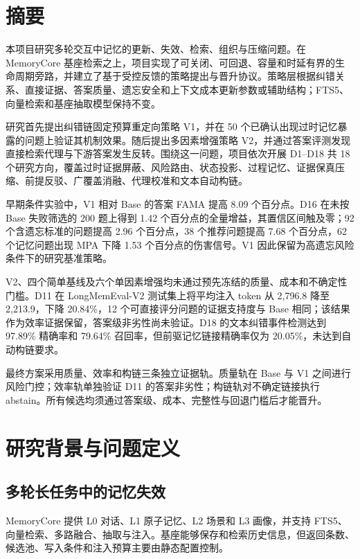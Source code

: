 \section*{摘要}

本项目研究多轮交互中记忆的更新、失效、检索、组织与压缩问题。在 MemoryCore 基座检索之上，项目实现了可关闭、可回退、容量和时延有界的生命周期旁路，并建立了基于受控反馈的策略提出与晋升协议。策略层根据纠错关系、直接证据、答案质量、遗忘安全和上下文成本更新参数或辅助结构；FTS5、向量检索和基座抽取模型保持不变。

研究首先提出纠错链固定预算重定向策略 V1，并在 50 个已确认出现过时记忆暴露的问题上验证其机制效果。随后提出多因素增强策略 V2，并通过答案评测发现直接检索代理与下游答案发生反转。围绕这一问题，项目依次开展 D1--D18 共 18 个研究方向，覆盖过时证据屏蔽、风险路由、状态投影、过程记忆、证据保真压缩、前提反驳、广覆盖消融、代理校准和文本自动构链。

早期条件实验中，V1 相对 Base 的答案 FAMA 提高 8.09 个百分点。D16 在未按 Base 失败筛选的 200 题上得到 1.42 个百分点的全量增益，其置信区间触及零；92 个含遗忘标准的问题提高 2.96 个百分点，38 个推荐问题提高 7.68 个百分点，62 个记忆问题出现 MPA 下降 1.53 个百分点的伤害信号。V1 因此保留为高遗忘风险条件下的研究基准策略。

V2、四个简单基线及六个单因素增强均未通过预先冻结的质量、成本和不确定性门槛。D11 在 LongMemEval-V2 测试集上将平均注入 token 从 2,796.8 降至 2,213.9，下降 20.84\%，12 个可直接评分问题的证据支持度与 Base 相同；该结果作为效率证据保留，答案级非劣性尚未验证。D18 的文本纠错事件检测达到 97.89\% 精确率和 79.64\% 召回率，但前驱记忆链接精确率仅为 20.05\%，未达到自动构链要求。

最终方案采用质量、效率和构链三条独立证据轨。质量轨在 Base 与 V1 之间进行风险门控；效率轨单独验证 D11 的答案非劣性；构链轨对不确定链接执行 abstain。所有候选均须通过答案级、成本、完整性与回退门槛后才能晋升。

\section{研究背景与问题定义}

\subsection{多轮长任务中的记忆失效}

MemoryCore 提供 L0 对话、L1 原子记忆、L2 场景和 L3 画像，并支持 FTS5、向量检索、多路融合、抽取与注入。基座能够保存和检索历史信息，但返回条数、候选池、写入条件和注入预算主要由静态配置控制。

